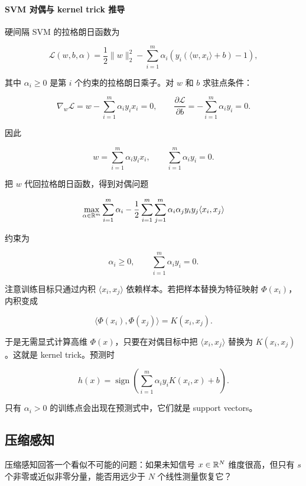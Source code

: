 \paragraph{SVM 对偶与 kernel trick 推导}

硬间隔 SVM 的拉格朗日函数为

\[
  \mathcal{L}(w,b,\alpha)
  =
  \frac12\|w\|_2^2
  -
  \sum_{i=1}^{m}
  \alpha_i
  \left(
    y_i(\langle w,x_i\rangle+b)-1
  \right),
\]

其中 \(\alpha_i\ge0\) 是第 \(i\) 个约束的拉格朗日乘子。对 \(w\) 和 \(b\) 求驻点条件：

\[
  \nabla_w\mathcal{L}
  =
  w-\sum_{i=1}^{m}\alpha_i y_i x_i
  =
  0,
  \qquad
  \frac{\partial\mathcal{L}}{\partial b}
  =
  -\sum_{i=1}^{m}\alpha_i y_i
  =
  0.
\]

因此

\[
  w=\sum_{i=1}^{m}\alpha_i y_i x_i,
  \qquad
  \sum_{i=1}^{m}\alpha_i y_i=0.
\]

把 \(w\) 代回拉格朗日函数，得到对偶问题

\[
  \max_{\alpha\in\mathbb{R}^m}
  \sum_{i=1}^{m}\alpha_i
  -
  \frac12
  \sum_{i=1}^{m}
  \sum_{j=1}^{m}
  \alpha_i\alpha_j y_i y_j
  \langle x_i,x_j\rangle
\]

约束为

\[
  \alpha_i\ge0,
  \qquad
  \sum_{i=1}^{m}\alpha_i y_i=0.
\]

注意训练目标只通过内积 \(\langle x_i,x_j\rangle\) 依赖样本。若把样本替换为特征映射 \(\Phi(x_i)\)，内积变成

\[
  \langle \Phi(x_i),\Phi(x_j)\rangle=K(x_i,x_j).
\]

于是无需显式计算高维 \(\Phi(x)\)，只要在对偶目标中把 \(\langle x_i,x_j\rangle\) 替换为 \(K(x_i,x_j)\)。这就是 kernel trick。预测时

\[
  h(x)
  =
  \operatorname{sign}
  \left(
    \sum_{i=1}^{m}
    \alpha_i y_i K(x_i,x)
    +
    b
  \right).
\]

只有 \(\alpha_i>0\) 的训练点会出现在预测式中，它们就是 support vectors。

\subsection{压缩感知}


压缩感知回答一个看似不可能的问题：如果未知信号 \(x\in\mathbb{R}^N\) 维度很高，但只有 \(s\) 个非零或近似非零分量，能否用远少于 \(N\) 个线性测量恢复它？

